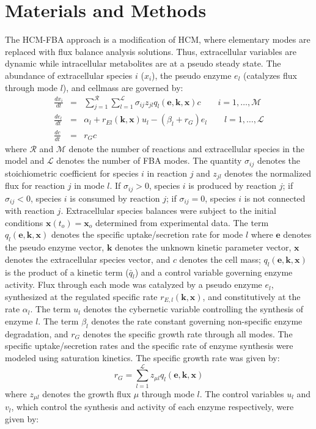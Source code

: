\documentclass[10pt,twocolumn,twoside,final]{IEEEtran}
\begin{document}
\section{Materials and Methods}
The HCM-FBA approach is a modification of HCM, where elementary modes are replaced with flux balance analysis solutions.
Thus, extracellular variables are dynamic while intracellular metabolites are at a pseudo steady state.
The abundance of extracellular species $i$ ($x_{i}$), the pseudo enzyme $e_{l}$ (catalyzes flux through mode $l$), and cellmass are governed by:
\begin{eqnarray}\nonumber
	\frac{dx_{i}}{dt}  & = &  \sum_{j = 1}^{\mathcal{R}}\sum_{l = 1}^{\mathcal{L}}\sigma_{ij}z_{jl}q_{l}\left(\mathbf{e},\mathbf{k},\mathbf{x}\right)c \qquad{i=1,\hdots,\mathcal{M}}\\\nonumber
  \frac{de_{l}}{dt}  & = & \alpha_{l} + r_{El}\left(\mathbf{k},\mathbf{x}\right)u_{l} - \left(\beta_{l}+r_{G}\right)e_{l} \qquad l=1,\hdots,\mathcal{L} \\\nonumber
  \frac{dc}{dt} & = & r_{G}c
\end{eqnarray}
where $\mathcal{R}$ and $\mathcal{M}$ denote the number of reactions and extracellular species in the model and $\mathcal{L}$ denotes the number of FBA modes.
The quantity $\sigma_{ij}$ denotes the stoichiometric coefficient for species $i$ in reaction $j$ and $z_{jl}$ denotes the normalized flux for reaction $j$ in mode $l$.
If $\sigma_{ij}>0$, species $i$ is produced by reaction $j$;
if $\sigma_{ij}<0$, species $i$ is consumed by reaction $j$; if $\sigma_{ij} = 0$, species $i$ is not connected with reaction $j$.
Extracellular species balances were subject to the initial conditions $\mathbf{x}\left(t_{o}\right) = \mathbf{x}_{o}$ determined from experimental data.
The term $q_{l}\left(\mathbf{e},\mathbf{k},\mathbf{x}\right)$ denotes the specific uptake/secretion rate for mode $l$
where $\mathbf{e}$ denotes the pseudo enzyme vector, $\mathbf{k}$ denotes the unknown kinetic parameter vector, $\mathbf{x}$ denotes the extracellular species vector, and $c$ denotes the cell mass;
$q_{l}\left(\mathbf{e},\mathbf{k},\mathbf{x}\right)$ is the product of a kinetic term ($\bar{q}_{l}$) and a control variable governing enzyme activity.
Flux through each mode was catalyzed by a pseudo enzyme $e_{l}$, synthesized at the regulated specific rate $r_{E,l}\left(\mathbf{k},\mathbf{x}\right)$, and constitutively at the rate $\alpha_{l}$.
The term $u_{l}$ denotes the cybernetic variable controlling the synthesis of enzyme $l$.
The term $\beta_{l}$ denotes the rate constant governing non-specific enzyme degradation, and $r_{G}$ denotes the specific growth rate through all modes.
The specific uptake/secretion rates and the specific rate of enzyme synthesis were modeled using saturation kinetics.
The specific growth rate was given by:
\begin{equation}\nonumber
	r_{G}  = \sum_{l = 1}^{\mathcal{L}}z_{\mu l}q_{l}\left(\mathbf{e},\mathbf{k},\mathbf{x}\right)
\end{equation}
where $z_{\mu l}$ denotes the growth flux $\mu$ through mode $l$.
The control variables $u_{l}$ and $v_{l}$, which control the synthesis and activity of each enzyme respectively, were given by:
\end{document}
